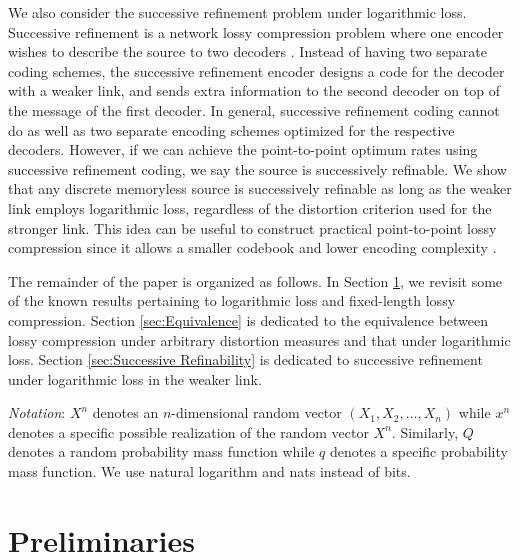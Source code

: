 \documentclass[draftclsnofoot, onecolumn, letterpaper, romanappendices]{IEEEtran}
\begin{document}
We also consider the successive refinement problem under logarithmic loss.
Successive refinement is a network lossy compression problem where one encoder wishes
to describe the source to two decoders \cite{equitz1991successive, koshelev1980hierarchical}.
Instead of having two separate coding schemes, the successive refinement encoder designs
a code for the decoder with a weaker link, and sends extra information to the second decoder
on top of the message of the first decoder.
In general, successive refinement coding cannot do as well as
two separate encoding schemes optimized for the respective decoders.
However, if we can achieve the point-to-point optimum rates using successive refinement coding,
we say the source is successively refinable.
We show that any discrete memoryless source is successively refinable as long as the weaker link
employs logarithmic loss, regardless of the distortion criterion used for the stronger link.
This idea can be useful to construct practical point-to-point lossy compression
since it allows a smaller codebook and lower encoding complexity
\cite{no2016strong, venkataramanan2014lossy, no2016rateless}. 

The remainder of the paper is organized as follows.
In Section \ref{sec:Preliminaries}, we revisit some of the known results pertaining to
logarithmic loss and fixed-length lossy compression.
Section \ref{sec:Equivalence} is dedicated to the equivalence between lossy compression under
arbitrary distortion measures and that under logarithmic loss.
Section \ref{sec:Successive Refinability} is dedicated to successive refinement under
logarithmic loss in the weaker link.

\emph{Notation}: $X^n$ denotes an $n$-dimensional random vector $(X_1,X_2,\ldots,X_n)$
while $x^n$ denotes a specific possible realization of the random vector $X^n$.
Similarly, $Q$ denotes a random probability mass function
while $q$ denotes a specific probability mass function.
We use natural logarithm and nats instead of bits.














\section{Preliminaries}\label{sec:Preliminaries}
\end{document}
